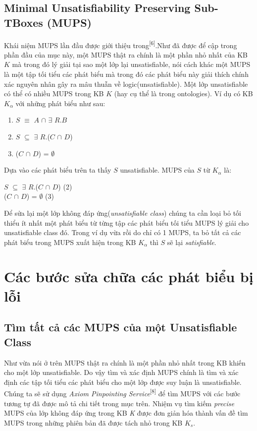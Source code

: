 \subsection{Minimal Unsatisfiability Preserving Sub-TBoxes (MUPS)}
Khái niệm MUPS lần đầu được giới thiệu trong\textsuperscript{[6]}.Như đã được để cập trong phần đầu của mục này, một MUPS thật ra chính là một phần nhỏ nhất của KB $K$ mà trong đó lý giải tại sao một lớp lại unsatisfiable, nói cách khác một MUPS là một tập tối tiểu các phát biểu mà trong đó các phát biểu này giải thích chính xác nguyên nhân gây ra mâu thuẫn về logic(unsatisfiable). Một lớp unsatisfiable có thể có nhiều MUPS trong KB $K$ (hay cụ thể là trong ontologies). Ví dụ có KB $K_{\alpha}$ với những phát biểu như sau:
\begin{enumerate}
\item
$S$ $\equiv$ $A$ $\cap$ $\exists$ $R.B$
\item
$S$ $\subseteq$ $\exists$ $R$.($C$ $\cap$ $D$) 
\item
($C$ $\cap$ $D$) = $\emptyset$ 
\end{enumerate}
Dựa vào các phát biểu trên ta thấy $S$ unsatisfiable. MUPS của $S$ từ $K_{\alpha}$ là:
\begin{center}
$S$ $\subseteq$ $\exists$ $R$.($C$ $\cap$ $D$) (2)
\\
($C$ $\cap$ $D$) = $\emptyset$ (3)
\end{center}
Để sửa lại một lớp không đáp ứng(\textit{unsatisfiable class}) chúng ta cần loại bỏ tối thiểu ít nhất một phát biểu từ từng tập các phát biểu tối tiểu MUPS lý giải cho unsatisfiable class đó. Trong ví dụ vừa rồi do chỉ có 1 MUPS, ta bỏ tất cả các phát biểu trong MUPS xuất hiện trong KB $K_{\alpha}$ thì $S$ sẽ lại \textit{satisfiable}.
\section{Các bước sửa chữa các phát biểu bị lỗi}

\subsection{Tìm tất cả các MUPS của một Unsatisfiable Class}
Như vừa nói ở trên MUPS thật ra chính là một phần nhỏ nhất trong KB khiến cho một lớp unsatisfiable. Do vậy tìm và xác định MUPS chính là tìm và xác định các tập tối tiểu các phát biểu cho một lớp được suy luận là  unsatisfiable. Chúng ta sẽ sử dụng \textit{Axiom Pinpointing Service}\textsuperscript{[8]} để tìm MUPS với các bước tương tự đã được mô tả chi tiết trong mục trên. Nhiệm vụ tìm kiếm \textit{precise} MUPS của lớp không đáp ứng trong KB \textit{K} được đơn giản hóa thành vấn đề tìm MUPS trong những phiên bản đã được tách nhỏ trong KB $K_{s}$.
